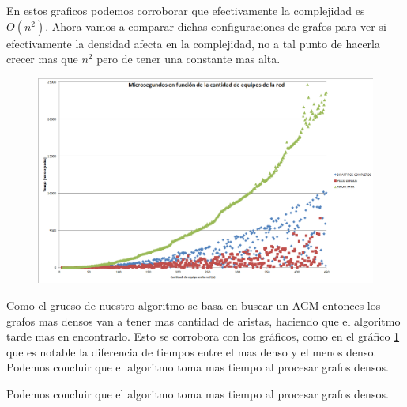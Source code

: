 En estos graficos podemos corroborar que efectivamente la complejidad es $O(n^2)$. Ahora vamos a comparar dichas configuraciones de grafos para ver si efectivamente la densidad afecta en la complejidad, no a tal punto de hacerla crecer mas que $n^2$ pero de tener una constante mas alta.


\begin{figure}[H]
                \includegraphics[scale=0.5]{ej3/Comparaciones}
                \caption{}
                \label{fig:exp22}
\end{figure}

Como el grueso de nuestro algoritmo se basa en buscar un AGM entonces los grafos mas densos van a tener mas cantidad de aristas, haciendo que el algoritmo tarde mas en encontrarlo. Esto se corrobora con los gráficos, como en el gráfico \ref{fig:exp22} que es notable la diferencia de tiempos entre el mas denso y el menos denso.\\
Podemos concluir que el algoritmo toma mas tiempo al procesar grafos densos.





Podemos concluir que el algoritmo toma mas tiempo al procesar grafos densos.
